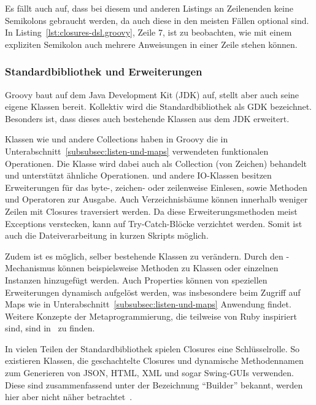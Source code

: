 \documentclass[a4paper]{article}
\begin{document}
Es fällt auch auf, dass bei diesem und anderen Listings an Zeilenenden keine Semikolons gebraucht werden, da auch diese in den meisten Fällen optional sind.
In Listing~\ref{lst:closures-dsl.groovy}, Zeile 7, ist zu beobachten, wie mit einem expliziten Semikolon auch mehrere Anweisungen in einer Zeile stehen können.

\subsubsection{Standardbibliothek und Erweiterungen}\label{subsubsec:standard-bibliothek}

Groovy baut auf dem Java Development Kit (JDK) auf, stellt aber auch seine eigene Klassen bereit.
Kollektiv wird die Standardbibliothek als GDK bezeichnet.
Besonders ist, dass dieses auch bestehende Klassen aus dem JDK erweitert.

Klassen wie  und andere Collections haben in Groovy die in Unterabschnitt~\ref{subsubsec:listen-und-maps} verwendeten funktionalen Operationen.
Die Klasse  wird dabei auch als Collection (von Zeichen) behandelt und unterstützt ähnliche Operationen.
 und andere IO-Klassen besitzen Erweiterungen für das byte-, zeichen- oder zeilenweise Einlesen, sowie Methoden und Operatoren zur Ausgabe.
Auch Verzeichnisbäume können innerhalb weniger Zeilen mit Closures traversiert werden.
Da diese Erweiterungsmethoden meist Exceptions verstecken, kann auf Try-Catch-Blöcke verzichtet werden.
Somit ist auch die Dateiverarbeitung in kurzen Skripts möglich.

Zudem ist es möglich, selber bestehende Klassen zu verändern.
Durch den -Mechanismus können beispielsweise Methoden zu Klassen oder einzelnen Instanzen hinzugefügt werden.
Auch Properties können von speziellen Erweiterungen dynamisch aufgelöst werden, was insbesondere beim Zugriff auf Maps wie in Unterabschnitt~\ref{subsubsec:listen-und-maps} Anwendung findet.
Weitere Konzepte der Metaprogrammierung, die teilweise von Ruby inspiriert sind, sind in~\cite[Abs.~3.4.]{groovy-lang:documentation} zu finden.

In vielen Teilen der Standardbibliothek spielen Closures eine Schlüsselrolle.
So existieren Klassen, die geschachtelte Closures und dynamische Methodennamen zum Generieren von JSON, HTML, XML und sogar Swing-GUIs verwenden.
Diese sind zusammenfassend unter der Bezeichnung ``Builder'' bekannt, werden hier aber nicht näher betrachtet~\cite[Abs.~3.15.8]{groovy-lang:documentation}.
\end{document}
